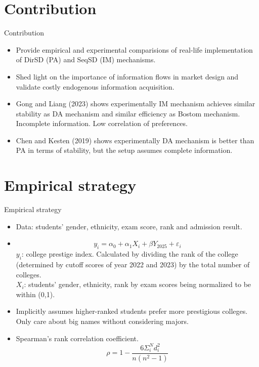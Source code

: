 \documentclass[dvipsnames,mathserif]{beamer}
\begin{document}
{\section{Contribution}
\begin{frame}{Contribution}
    \begin{itemize}
        \item Provide empirical and experimental comparisions of real-life implementation of DirSD (PA) and SeqSD (IM) mechanisms.
        \vspace{0.2cm}
        \item Shed light on the importance of information flows in market design and validate costly endogenous information acquisition.
        \vspace{0.2cm}
        \item Gong and Liang (2023) shows experimentally IM mechanism achieves similar stability as DA mechanism and similar efficiency as Bostom mechanism. Incomplete information. Low correlation of preferences.
        \vspace{0.2cm}
        \item Chen and Kesten (2019) shows experimentally DA mechanism is better than PA in terms of stability, but the setup assumes complete information.   
    \end{itemize}
\end{frame}


\section{Empirical strategy}
\begin{frame}{Empirical strategy}
	\begin{itemize}
		\item Data: students' gender, ethnicity, exam score, rank and admission result.
        \item \[y_i = \alpha_0 + \alpha_1 X_i + \beta Y_{2025} + \varepsilon_i\]
        $y_i$: college prestige index. Calculated by dividing the rank of the college (determined by cutoff scores of year 2022 and 2023) by the total number of colleges.\\
        $X_i$: students' gender, ethnicity, rank by exam scores being normalized to be within (0,1).\\
        \item Implicitly assumes higher-ranked students prefer more prestigious colleges. Only care about big names without considering majors. \\
        \item Spearman's rank correlation coefficient.
        \[\rho = 1 -  \frac{6\Sigma_{i}^{N}d_i^2}{n(n^2-1)}\]
        

\end{itemize}
\end{frame}}
\end{document}
